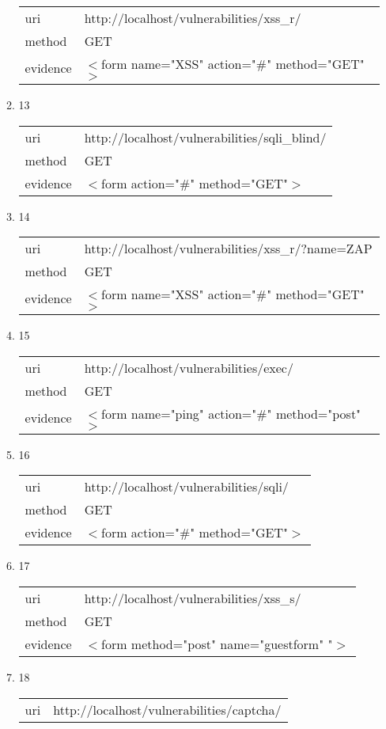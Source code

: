 \documentclass[10pt]{article}
\begin{document}
\begin{itemize}
\begin{enumerate}
\begin{tabular}{| l | p{12cm}}
uri & http://localhost/vulnerabilities/xss\_r/ \\
method & GET \\
evidence & $<$form name="XSS" action="\#" method="GET"$>$ \\
\end{tabular}
\item[] 13
\begin{tabular}{| l | p{12cm}}
uri & http://localhost/vulnerabilities/sqli\_blind/ \\
method & GET \\
evidence & $<$form action="\#" method="GET"$>$ \\
\end{tabular}
\item[] 14
\begin{tabular}{| l | p{12cm}}
uri & http://localhost/vulnerabilities/xss\_r/?name=ZAP \\
method & GET \\
evidence & $<$form name="XSS" action="\#" method="GET"$>$ \\
\end{tabular}
\item[] 15
\begin{tabular}{| l | p{12cm}}
uri & http://localhost/vulnerabilities/exec/ \\
method & GET \\
evidence & $<$form name="ping" action="\#" method="post"$>$ \\
\end{tabular}
\item[] 16
\begin{tabular}{| l | p{12cm}}
uri & http://localhost/vulnerabilities/sqli/ \\
method & GET \\
evidence & $<$form action="\#" method="GET"$>$ \\
\end{tabular}
\item[] 17
\begin{tabular}{| l | p{12cm}}
uri & http://localhost/vulnerabilities/xss\_s/ \\
method & GET \\
evidence & $<$form method="post" name="guestform" "$>$ \\
\end{tabular}
\item[] 18
\begin{tabular}{| l | p{12cm}}
uri & http://localhost/vulnerabilities/captcha/ \\

\end{tabular}
\end{enumerate}
\end{itemize}
\end{document}

